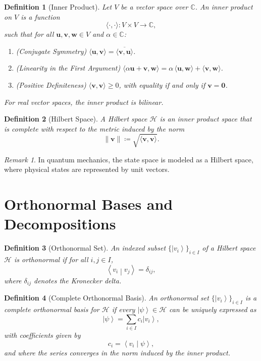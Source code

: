 \documentclass[11pt,oneside]{book}
\newtheorem{definition}{Definition}[chapter]
\theoremstyle{remark}
\newtheorem*{remark}{Remark}
\renewcommand{\ket}[1]{\left| #1 \right\rangle}
\renewcommand{\braket}[2]{\left\langle #1 \middle| #2 \right\rangle}
\begin{document}
	\begin{definition}[Inner Product]
		Let $V$ be a vector space over $\mathbb{C}$. An \emph{inner product} on $V$ is a function
		\[
		\langle \cdot,\cdot \rangle: V \times V \to \mathbb{C},
		\]
		such that for all $\mathbf{u},\mathbf{v},\mathbf{w}\in V$ and $\alpha\in \mathbb{C}$:
		\begin{enumerate}[label=(\roman*)]
			\item (Conjugate Symmetry) $\langle \mathbf{u},\mathbf{v} \rangle = \overline{\langle \mathbf{v},\mathbf{u} \rangle}$.
			\item (Linearity in the First Argument) $\langle \alpha \mathbf{u} + \mathbf{v}, \mathbf{w} \rangle = \alpha\,\langle \mathbf{u},\mathbf{w} \rangle + \langle \mathbf{v},\mathbf{w} \rangle$.
			\item (Positive Definiteness) $\langle \mathbf{v},\mathbf{v} \rangle \ge 0$, with equality if and only if $\mathbf{v}=\mathbf{0}$.
		\end{enumerate}
		For real vector spaces, the inner product is bilinear.
	\end{definition}
	
	\begin{definition}[Hilbert Space]
		A \emph{Hilbert space} $\mathcal{H}$ is an inner product space that is complete with respect to the metric induced by the norm
		\[
		\|\mathbf{v}\| \coloneqq \sqrt{\langle \mathbf{v},\mathbf{v} \rangle}.
		\]
	\end{definition}
	
	\begin{remark}
		In quantum mechanics, the state space is modeled as a Hilbert space, where physical states are represented by unit vectors.
	\end{remark}
	
	\section{Orthonormal Bases and Decompositions}
	\begin{definition}[Orthonormal Set]
		An indexed subset $\{\ket{v_i}\}_{i \in I}$ of a Hilbert space $\mathcal{H}$ is \emph{orthonormal} if for all $i,j\in I$,
		\[
		\braket{v_i}{v_j} = \delta_{ij},
		\]
		where $\delta_{ij}$ denotes the Kronecker delta.
	\end{definition}
	
	\begin{definition}[Complete Orthonormal Basis]
		An orthonormal set $\{\ket{v_i}\}_{i\in I}$ is a \emph{complete orthonormal basis} for $\mathcal{H}$ if every $\ket{\psi}\in \mathcal{H}$ can be uniquely expressed as
		\[
		\ket{\psi} = \sum_{i\in I} c_i \ket{v_i},
		\]
		with coefficients given by
		\[
		c_i = \braket{v_i}{\psi},
		\]
		and where the series converges in the norm induced by the inner product.
	\end{definition}
	
\end{document}

